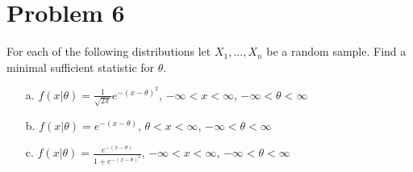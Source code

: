 \documentclass{article}
\begin{document}
\clearpage

\section*{Problem 6}
For each of the following distributions let $X_1,...,X_n$ be a random sample. Find a minimal sufficient statistic for $\theta$.
\begin{enumerate}
\item[a.] $f(x|\theta) = \frac{1}{\sqrt{2\pi}} e^{-(x-\theta)^2}$, $-\infty < x < \infty$, $-\infty < \theta < \infty$
\item[b.] $f(x|\theta) = e^{-(x-\theta)}$, $\theta < x < \infty$, $-\infty < \theta < \infty$
\item[c.] $f(x|\theta) = \frac{e^{-(x-\theta)}}{1+e^{-(x-\theta)^2}} $, $-\infty < x < \infty$, $-\infty < \theta < \infty$
\end{enumerate}
\end{document}
